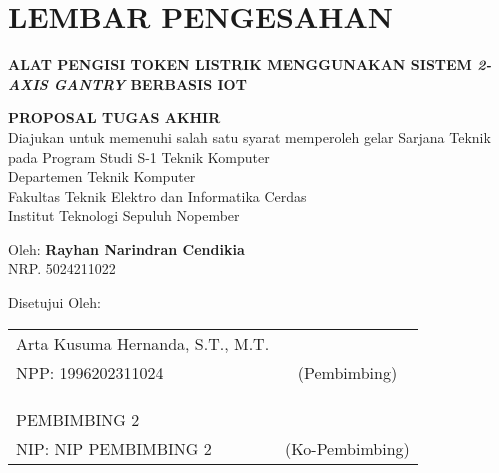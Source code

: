 \chapter*{LEMBAR PENGESAHAN}

\thispagestyle{empty}

\begin{center}
  \textbf{ALAT PENGISI TOKEN LISTRIK MENGGUNAKAN SISTEM \emph{2-AXIS GANTRY} BERBASIS IOT}
\end{center}

\begingroup
\small

\begin{center}
  \textbf{PROPOSAL TUGAS AKHIR} \\
  Diajukan untuk memenuhi salah satu syarat memperoleh gelar
  Sarjana Teknik pada
  Program Studi S-1 Teknik Komputer \\
  Departemen Teknik Komputer \\
  Fakultas Teknik Elektro dan Informatika Cerdas \\
  Institut Teknologi Sepuluh Nopember
\end{center}

\begin{center}
  Oleh: \textbf{Rayhan Narindran Cendikia} \\
  NRP. 5024211022
\end{center}

\begin{center}
  Disetujui Oleh:
\end{center}

\vspace{10ex}

\begingroup
\setlength{\tabcolsep}{0pt}

\noindent
\begin{tabularx}{\textwidth}{X c}
  Arta Kusuma Hernanda, S.T., M.T.      &                 \\
  NPP: 1996202311024                    & (Pembimbing)    \\
                                        &                 \\
                                        &                 \\
                                        &                 \\
  PEMBIMBING 2                          &                 \\
  NIP: NIP PEMBIMBING 2                 & (Ko-Pembimbing) \\
\end{tabularx}
\endgroup

